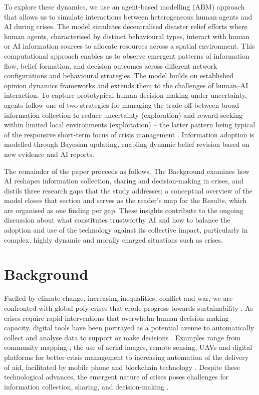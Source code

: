 \documentclass[pdflatex,sn-basic]{sn-jnl}
\begin{document}
To explore these dynamics, we use an agent-based modelling (ABM) approach that allows us to simulate interactions between heterogeneous human agents and AI during crises. The model simulates decentralised disaster relief efforts where human agents, characterised by distinct behavioural types, interact with human or AI information sources to allocate resources across a spatial environment. This computational approach enables us to observe emergent patterns of information flow, belief formation, and decision outcomes across different network configurations and behavioural strategies. The model builds on established opinion dynamics frameworks \citep{deffuant2000mixing,hegselmann2002opinion}
and extends them to the challenges of human--AI interaction. To capture prototypical human decision-making under uncertainty, agents follow one of two strategies for managing the trade-off between broad information collection to reduce uncertainty (exploration) and reward-seeking within limited local environments (exploitation) -- the latter pattern being typical of the responsive short-term focus of crisis management \citep{comes2020coordination,march1991exploration}.
Information adoption is modelled through Bayesian updating, enabling dynamic belief revision based on new evidence and AI reports.

The remainder of the paper proceeds as follows. The Background examines how AI reshapes information collection, sharing and decision-making in crises, and distils three research gaps that the study addresses; a conceptual overview of the model closes that section and serves as the reader's map for the Results, which are organised as one finding per gap. These insights contribute to the ongoing discussion about what constitutes trustworthy AI and how to balance the adoption and use of the technology against its collective impact, particularly in complex, highly dynamic and morally charged situations such as crises.

\section{Background}\label{sec:background}

Fuelled by climate change, increasing inequalities, conflict and war, we are confronted with global poly-crises that erode progress towards sustainability \citep{sogaard2024evolution}.
As crises require rapid interventions that overwhelm human decision-making capacity, digital tools have been portrayed as a potential avenue to automatically collect and analyse data to support or make decisions \citep{qadir2016crisis}.
Examples range from community mapping \citep{champlin2023measuring,soden2014crowdsourced}, the use of aerial images, remote sensing, UAVs and digital platforms for better crisis management \citep{voigt2007satellite} to increasing automation of the delivery of aid, facilitated by mobile phone and blockchain technology \citep{baharmand2019leveraging,coughlan2015forecast}.
Despite these technological advances, the emergent nature of crises poses challenges for information collection, sharing, and decision-making \citep{nespeca2020towards,turoff2004design}.
\end{document}
